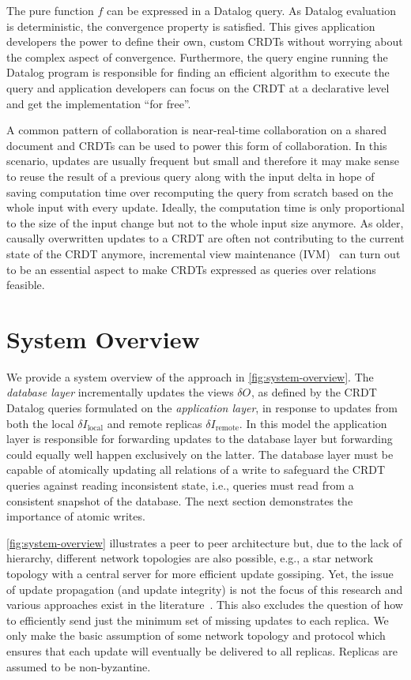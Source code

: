 \documentclass{article}
\newcommand{\deltaI}[1]{\(\delta I_{\text{#1}}\)}
\newcommand{\deltaO}[1][]{\(\delta O_{\text{#1}}\)}
\begin{document}
The pure function \( f \) can be expressed in a Datalog query.
As Datalog evaluation is deterministic, the convergence property is satisfied.
This gives application developers the power to define their own, custom CRDTs
without worrying about the complex aspect of convergence.
Furthermore, the query engine running the Datalog program is responsible
for finding an efficient algorithm to execute the query and application developers
can focus on the CRDT at a declarative level and get the implementation ``for free''.

A common pattern of collaboration is near-real-time collaboration on a shared
document and CRDTs can be used to power this form of collaboration.
In this scenario, updates are usually frequent but small and therefore it
may make sense to reuse the result of a previous query along with the input
delta in hope of saving computation time over recomputing the query from scratch
based on the whole input with every update.
Ideally, the computation time is only proportional to the size of the input
change but not to the whole input size anymore.
As older, causally overwritten updates to a CRDT are often not contributing
to the current state of the CRDT anymore, incremental view
maintenance (IVM)~\cite{mcsherry2013differential, budiu2022dbsp, budiu2024dbsp}
can turn out to be an essential aspect to make CRDTs expressed as
queries over relations feasible.

\section{System Overview}
\label{sec:system-overview}

We provide a system overview of the approach in \autoref{fig:system-overview}.
The \emph{database layer} incrementally updates the views \deltaO{},
as defined by the CRDT Datalog queries formulated on the \emph{application layer},
in response to updates from both the local \deltaI{local} and remote replicas
\deltaI{remote}.
In this model the application layer is responsible for forwarding updates
to the database layer but forwarding could equally well happen exclusively
on the latter.
The database layer must be capable of atomically updating all relations
of a write to safeguard the CRDT queries against reading inconsistent
state, i.e., queries must read from a consistent snapshot of the database.
The next section demonstrates the importance of atomic writes.

\autoref{fig:system-overview} illustrates a peer to peer architecture
but, due to the lack of hierarchy, different network topologies are also possible,
e.g., a star network topology with a central server for more efficient update
gossiping.
Yet, the issue of update propagation (and update integrity) is not the focus
of this research and various approaches exist in the literature~\cite{
	auvolat2019merkle, sanjuan2020merkle, kleppmann2024bluesky,
	kleppmann2022making}.
This also excludes the question of how to efficiently send just the minimum
set of missing updates to each replica.
We only make the basic assumption of some network topology and protocol
which ensures that each update will eventually be delivered to all replicas.
Replicas are assumed to be non-byzantine.
\end{document}
